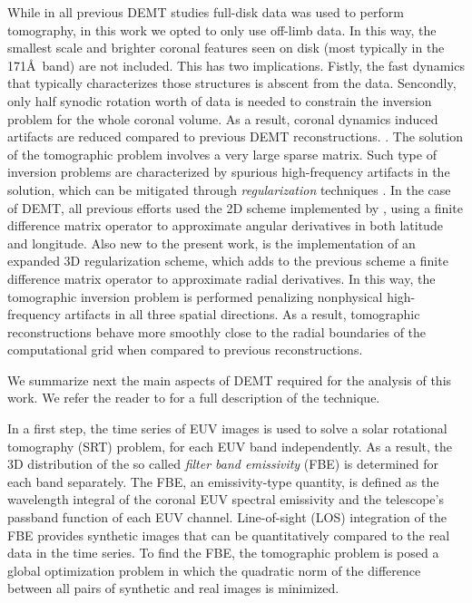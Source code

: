 \documentclass[namedreferences]{solarphysics}
\begin{document}
\begin{article}
{While in all previous DEMT studies full-disk data was used to perform tomography, in this work we opted to only use off-limb data. In this way, the smallest scale and brighter coronal features seen on disk (most typically in the 171\AA\ band) are not included. This has two implications. Fistly, the fast dynamics that typically characterizes those structures is abscent from the data. Sencondly, only half synodic rotation worth of data is needed to constrain the inversion problem for the whole coronal volume. As a result, coronal dynamics induced artifacts are reduced compared to previous DEMT reconstructions.}
.
{The solution of the tomographic problem involves a very large sparse matrix. Such type of inversion problems are characterized by spurious high-frequency artifacts in the solution, which can be mitigated through \emph{regularization} techniques \citep{frazin_2000}. In the case of DEMT, all previous efforts used the 2D scheme implemented by \citet{frazin_2009}, using a finite difference matrix operator to approximate angular derivatives in both latitude and longitude. Also new to the present work, is the implementation of an expanded 3D regularization scheme, which adds to the previous scheme a finite difference matrix operator to approximate radial derivatives. In this way, the tomographic inversion problem is performed penalizing nonphysical high-frequency artifacts in all three spatial directions. As a result, tomographic reconstructions behave more smoothly close to the radial boundaries of the computational grid when compared to previous reconstructions.}

{We summarize next the main aspects of DEMT required for the analysis of this work. We refer the reader to \citet{frazin_2009} for a full description of the technique.}

In a first step, the time series of EUV images is used to solve a solar rotational tomography (SRT) problem, for each EUV band independently. As a result, the 3D distribution of the so called \emph{filter band emissivity} (FBE) is determined for each band separately. The FBE, {an emissivity-type quantity}, is defined as the wavelength integral of the coronal EUV spectral emissivity and the telescope's passband function of each EUV channel. Line-of-sight (LOS) integration of the FBE provides synthetic images that can be quantitatively compared to the real data in the time series. To find the FBE, the tomographic problem is posed a global optimization problem in which the quadratic norm of the difference between all {pairs of synthetic and real images is minimized.}


\end{article}
\end{document}
